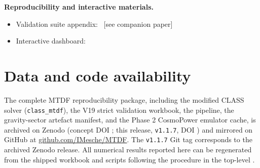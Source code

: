 \documentclass[11pt,a4paper]{article}
\begin{document}
\begin{mdframed}[linecolor=accent,linewidth=0.5pt,backgroundcolor=callout-bg,leftline=true,rightline=true,topline=true,bottomline=true,innerleftmargin=8pt,innerrightmargin=8pt,innertopmargin=6pt,innerbottommargin=6pt]
\textbf{Reproducibility and interactive materials.}\begin{itemize}
  \item Validation suite appendix: \textit{{\small\protect{}}}~[see companion paper]
  \item Interactive dashboard: {\small\protect{}}
\end{itemize}
\end{mdframed}

\section{Data and code availability}
The complete MTDF reproducibility package, including the modified CLASS solver
(\texttt{class\_\allowbreak{}mtdf}), the V19 strict validation workbook, the
\texttt{{\small\protect{}}} pipeline, the gravity-sector artefact manifest,
and the Phase 2 CosmoPower emulator cache, is archived on Zenodo
(concept DOI \href{https://doi.org/10.5281/zenodo.19741058}{{\small\protect{}}};
this release, \texttt{v1.1.7}, DOI
\href{https://doi.org/10.5281/zenodo.21525855}{{\small\protect{}}})
and mirrored on GitHub at
\href{https://github.com/IMesche/MTDF}{github.com/\allowbreak{}IMesche/\allowbreak{}MTDF}.
The \texttt{v1.1.7} Git tag corresponds to the archived Zenodo release. All
numerical results reported here can be regenerated from the shipped workbook
and scripts following the procedure in the top-level \texttt{{\small\protect{}}}.
\end{document}
